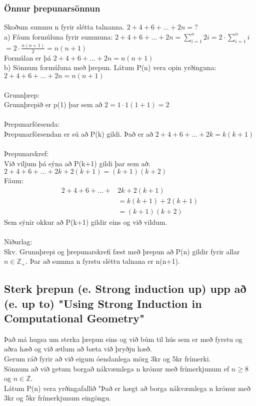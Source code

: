 \newpage
\subsubsection{Önnur þrepunarsönnun}
Skoðum summu n fyrir slétta talnanna. $2+4+6+\ldots + 2n = ?$\\
a) Fáum formúluna fyrir summuna:
$2+4+6+\ldots+2n = \displaystyle \sum_{i=1}^{n} 2i = 2 \cdot \sum_{i=1}^{n} i$\\
$= 2 \cdot \frac{n(n+1)}{2} = n(n+1)$\\
Formúlan er þá $2+4+6+\ldots+2n = n(n+1)$\\
b) Sönnum formúluna með þrepun. Látum P(n) vera opin yrðinguna:\\ 
$2+4+6+\ldots+2n = n(n+1)$\\ \\
Grunnþrep:\\
Grunnþrepið er p(1) þar sem að $2 = 1\cdot 1(1+1) = 2$\\ \\
Þrepunarförsenda:\\
Þrepunarförsendan er sú að P(k) gildi. Það er að $2+4+6+\ldots+2k = k(k+1)$\\ \\
Þrepunarskref:\\
Við viljum þá sýna að P(k+1) gildi þar sem að:\\ 
$2+4+6+\ldots+2k +2(k+1) = (k+1)(k+2)$\\
Fáum: 
\begin{align*}
    2+4+6+\ldots+&2k +2(k+1) \\
    &=k(k+1)+2(k+1) \\
    &= (k+1)(k+2)
\end{align*}
Sem sýnir okkur að P(k+1) gildir eins og við vildum.\\ \\
Niðurlag: \\
Skv. Grunnþrepi og þrepunarskrefi fæst með þrepun að P(n) gildir fyrir allar $n \in \mathbb{Z_+}$. Þar að summa n fyrstu sléttu talnana er n(n+1).

\newpage
\subsection{Sterk þrepun (e. Strong induction up) upp að (e. up to) "Using Strong Induction in Computational Geometry"}
Það má hugsa um sterka þrepun eins og við búm til hús sem er með fyrstu og aðra hæð og við ætlum að bæta við þryðju hæð.\vspace*{0.6em} \\
Gerum ráð fyrir að við eigum óendanlega mörg 3kr og 5kr frímerki.\\
Sönnum að við getum borgað nákvæmlega n krónur með frímerkjunum ef $n \geq 8$ og $n \in \mathbb{Z}$. \\
Látum P(n) vera yrðingafallið "Það er hægt að borga nákvæmlega n krónur með 3kr og 5kr frímerkjunum eingöngu.\\

